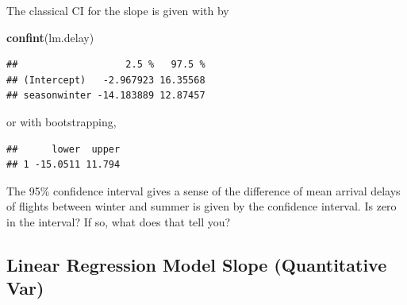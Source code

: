 \documentclass[
]{book}
\newenvironment{Shaded}{\begin{snugshade}}{\end{snugshade}}
\newcommand{\CommentTok}[1]{\textcolor[rgb]{0.56,0.35,0.01}{\textit{#1}}}
\newcommand{\DataTypeTok}[1]{\textcolor[rgb]{0.13,0.29,0.53}{#1}}
\newcommand{\DecValTok}[1]{\textcolor[rgb]{0.00,0.00,0.81}{#1}}
\newcommand{\KeywordTok}[1]{\textcolor[rgb]{0.13,0.29,0.53}{\textbf{#1}}}
\newcommand{\NormalTok}[1]{#1}
\newcommand{\OperatorTok}[1]{\textcolor[rgb]{0.81,0.36,0.00}{\textbf{#1}}}
\newcommand{\OtherTok}[1]{\textcolor[rgb]{0.56,0.35,0.01}{#1}}
\newcommand{\StringTok}[1]{\textcolor[rgb]{0.31,0.60,0.02}{#1}}
\begin{document}
The classical CI for the slope is given with by

\begin{Shaded}
\begin{Highlighting}[]
\KeywordTok{confint}\NormalTok{(lm.delay)}
\end{Highlighting}
\end{Shaded}

\begin{verbatim}
##                   2.5 %   97.5 %
## (Intercept)   -2.967923 16.35568
## seasonwinter -14.183889 12.87457
\end{verbatim}

or with bootstrapping,

\begin{Shaded}
\end{Shaded}

\begin{verbatim}
##      lower  upper
## 1 -15.0511 11.794
\end{verbatim}

The 95\% confidence interval gives a sense of the difference of mean arrival delays of flights between winter and summer is given by the confidence interval. Is zero in the interval? If so, what does that tell you?

\hypertarget{linear-regression-model-slope-quantitative-var}{%
\subsection{Linear Regression Model Slope (Quantitative Var)}\label{linear-regression-model-slope-quantitative-var}}
\end{document}
